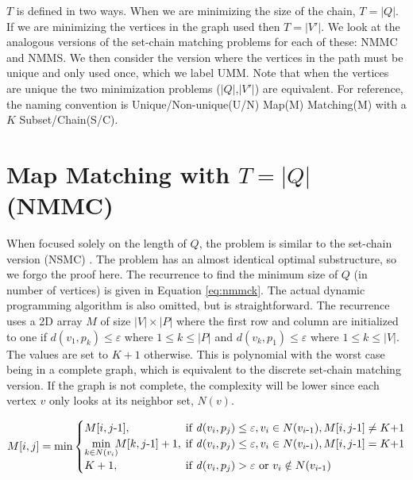 \documentclass{article}[11pt]
\newcommand{\dist}{\mathit{d}}
\begin{document}
$T$ is defined in two ways.  When we are minimizing the size of the chain, $T=|Q|$.
If we are minimizing the vertices in the graph used then $T=|V'|$.   
We look at the analogous
versions of the set-chain matching problems for each of these: NMMC and NMMS.
We then consider the version where the vertices in the path must be unique and only
used once, which we label UMM.  
Note that when the vertices are unique the two minimization problems ($|Q|$,$|V'|$)
are equivalent.
For reference, the naming convention is Unique/Non-unique(U/N) 
Map(M) Matching(M) with a $K$ Subset/Chain(S/C).  










\section{Map Matching with $T=|Q|$ (NMMC)}\label{sec:nmmck}



When focused solely on the length of $Q$, the problem is similar to the set-chain
version (NSMC) \cite{Wylie:2014:TCS}.  The problem has an almost identical 
optimal substructure, so we forgo the proof here.  The recurrence to find the minimum
size of $Q$ (in number of vertices) is given in Equation \ref{eq:nmmck}. The
actual dynamic programming algorithm is also omitted, but is straightforward.
The recurrence uses a 2D array $M$ of size $|V| \times |P|$ where the first row and column are
initialized to one if $\dist(v_1,p_k) \leq \varepsilon$ where $1 \leq k \leq |P|$ 
and $\dist(v_k,p_1) \leq \varepsilon$ where $1 \leq k \leq |V|$. The values are set to $K+1$ otherwise.
This is polynomial with the worst case being
in a complete graph, which is equivalent to the discrete set-chain matching version.  
If the graph is not complete, the complexity will be lower since each vertex $v$ only looks at 
its neighbor set, $N(v)$.



\begin{equation}
    M[i,j] = \min
    \begin{cases}
        M[i,j\mbox{-}1], & \hspace*{-.2cm} \mbox{if } \dist(v_i,p_j) \leq \varepsilon, v_i \in N(v_{i\mbox{-}1}), 
                 M[i,j\mbox{-}1] \neq K\mbox{+}1 \\
        \underset{k \in N(v_i)}{\min} \hspace*{-.1cm} M[k,j\mbox{-}1] + 1, & \hspace*{-.2cm} \mbox{if } \dist(v_i,p_j) \leq \varepsilon, v_i \in N(v_{i\mbox{-}1}), 
                 M[i,j\mbox{-}1] = K\mbox{+}1 \\
        K+1, & \hspace*{-.2cm} \mbox{if } \dist(v_i,p_j) > \varepsilon \mbox{ or } v_i \notin N(v_{i\mbox{-}1})
    \end{cases}
    \label{eq:nmmck}
\end{equation}
\end{document}
